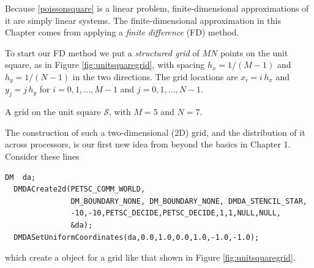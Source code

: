 Because \eqref{poissonsquare} is a linear problem, finite-dimensional approximations of it are simply linear systems.  The finite-dimensional approximation in this Chapter comes from applying a \emph{finite difference} (FD) method.

To start our FD method we put a \emph{structured grid} of $MN$ points on the unit square, as in Figure \ref{fig:unitsquaregrid}, with spacing $h_x=1/(M-1)$ and $h_y=1/(N-1)$ in the two directions.  The grid locations are $x_i = i\, h_x$ and $y_j = j\, h_y$ for $i = 0,1,\dots,M-1$ and $j=0,1,\dots,N-1$.

\begin{marginfigure}
\caption{A grid on the unit square $\mathcal{S}$, with $M=5$ and $N=7$.}
\label{fig:unitsquaregrid}
\end{marginfigure}

The construction of such a two-dimensional (2D) grid, and the distribution of it across processors, is our first new idea from \PETSc beyond the basics in Chapter 1.  Consider these lines
\begin{Verbatim}[fontsize=\small]
  DM  da;
  DMDACreate2d(PETSC_COMM_WORLD,
               DM_BOUNDARY_NONE, DM_BOUNDARY_NONE, DMDA_STENCIL_STAR,
               -10,-10,PETSC_DECIDE,PETSC_DECIDE,1,1,NULL,NULL,
               &da);
  DMDASetUniformCoordinates(da,0.0,1.0,0.0,1.0,-1.0,-1.0);
\end{Verbatim}
\medskip\noindent
which create a \PETSc \pDM object for a grid like that shown in Figure \ref{fig:unitsquaregrid}.

